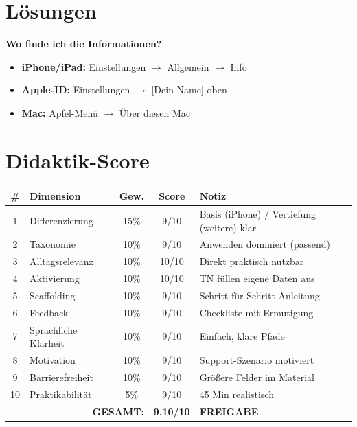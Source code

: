 \documentclass[11pt,a4paper]{article}
\begin{document}
\section{Lösungen}

\textbf{Wo finde ich die Informationen?}
\begin{itemize}
    \item \textbf{iPhone/iPad:} Einstellungen $\rightarrow$ Allgemein $\rightarrow$ Info
    \item \textbf{Apple-ID:} Einstellungen $\rightarrow$ [Dein Name] oben
    \item \textbf{Mac:} Apfel-Menü $\rightarrow$ Über diesen Mac
\end{itemize}

\section{Didaktik-Score}

\begin{scorebox}
\begin{tabular}{|c|l|c|c|p{3.5cm}|}
\hline
\# & Dimension & Gew. & Score & Notiz \\
\hline
1 & Differenzierung & 15\% & 9/10 & Basis (iPhone) / Vertiefung (weitere) klar \\
2 & Taxonomie & 10\% & 9/10 & Anwenden dominiert (passend) \\
3 & Alltagsrelevanz & 10\% & 10/10 & Direkt praktisch nutzbar \\
4 & Aktivierung & 10\% & 10/10 & TN füllen eigene Daten aus \\
5 & Scaffolding & 10\% & 9/10 & Schritt-für-Schritt-Anleitung \\
6 & Feedback & 10\% & 9/10 & Checkliste mit Ermutigung \\
7 & Sprachliche Klarheit & 10\% & 9/10 & Einfach, klare Pfade \\
8 & Motivation & 10\% & 9/10 & Support-Szenario motiviert \\
9 & Barrierefreiheit & 10\% & 9/10 & Größere Felder im Material \\
10 & Praktikabilität & 5\% & 9/10 & 45 Min realistisch \\
\hline
\multicolumn{3}{|r|}{\textbf{GESAMT:}} & \textbf{9.10/10} & \textcolor{successgreen}{\textbf{FREIGABE}} \\
\hline
\end{tabular}
\end{scorebox}
\end{document}
